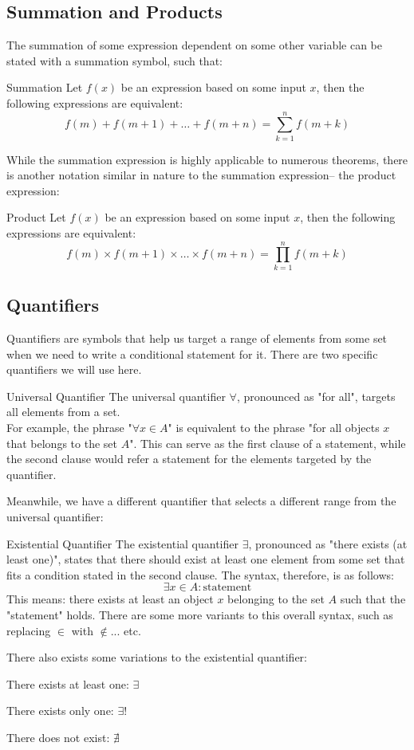\subsection{Summation and Products}
The summation of some expression dependent on some other variable can be stated with a summation symbol, such that:
\begin{ln-symbol}{Summation}{}
    Let $f(x)$ be an expression based on some input $x$, then the following expressions are equivalent:
    \[f(m) + f(m + 1) + \dots + f(m + n) = \sum_{k = 1}^{n} {f(m + k)}\]
\end{ln-symbol}
While the summation expression is highly applicable to numerous theorems, there is another notation similar in nature to the summation expression-- the product expression:
\begin{ln-symbol}{Product}{}
    Let $f(x)$ be an expression based on some input $x$, then the following expressions are equivalent:
    \[f(m) \times f(m + 1) \times \dots \times f(m + n) = \prod_{k = 1}^{n} {f(m + k)}\]
\end{ln-symbol}

\subsection{Quantifiers}
Quantifiers are symbols that help us target a range of elements from some set when we need to write a conditional statement for it. There are two specific quantifiers we will use here.
\begin{ln-symbol}{Universal Quantifier}{}
    The universal quantifier $\forall$, pronounced as "for all", targets all elements from a set. \\
    For example, the phrase "$\forall x \in A$" is equivalent to the phrase "for all objects $x$ that belongs to the set $A$". This can serve as the first clause of a statement, while the second clause would refer a statement for the elements targeted by the quantifier.
\end{ln-symbol}
Meanwhile, we have a different quantifier that selects a different range from the universal quantifier:
\begin{ln-symbol}{Existential Quantifier}{}
    The existential quantifier $\exists$, pronounced as "there exists (at least one)", states that there should exist at least one element from some set that fits a condition stated in the second clause. The syntax, therefore, is as follows:
    \[ \exists x \in A : \text{statement}\]
    This means: there exists at least an object $x$ belonging to the set $A$ such that the "statement" holds. There are some more variants to this overall syntax, such as replacing $\in$ with $\notin$... etc.
\end{ln-symbol}
There also exists some variations to the existential quantifier:
\begin{bindenum}
    \item There exists at least one: $\exists$
    \item There exists only one: $\exists!$
    \item There does not exist: $\nexists$
\end{bindenum}